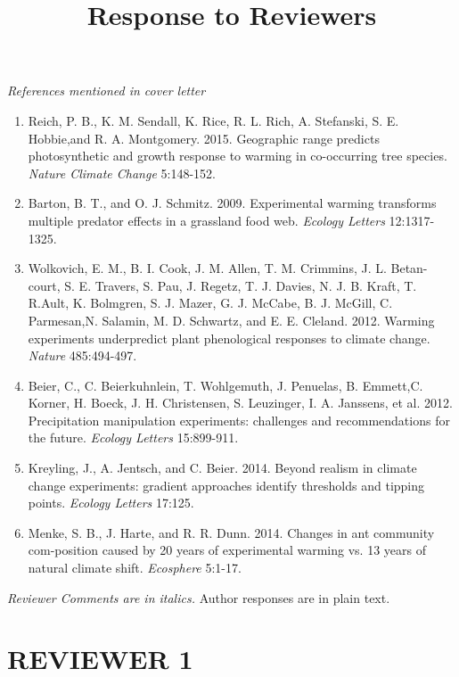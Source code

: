 \documentclass[11pt,a4paper]{letter}
\begin{document}
\begin{letter}{}
\noindent \emph{References mentioned in cover letter}
\begin{footnotesize}
\begin{enumerate}
\item Reich,  P. B.,  K. M. Sendall,  K. Rice,  R. L. Rich,  A. Stefanski,  S. E. Hobbie,and R. A. Montgomery. 2015.  Geographic range predicts photosynthetic and growth response to warming in co-occurring tree species.  \emph{Nature Climate Change} 5:148-152.
\item Barton,  B.  T.,  and  O.  J.  Schmitz.  2009.   Experimental  warming  transforms multiple predator effects in a grassland food web.   \emph{Ecology Letters} 12:1317-1325.
\item Wolkovich,  E.  M.,  B.  I.  Cook,  J.  M.  Allen,  T.  M.  Crimmins,  J.  L.  Betan-court, S. E. Travers, S. Pau, J. Regetz, T. J. Davies, N. J. B. Kraft, T. R.Ault, K. Bolmgren, S. J. Mazer, G. J. McCabe, B. J. McGill, C. Parmesan,N. Salamin, M. D. Schwartz, and E. E. Cleland. 2012.  Warming experiments underpredict plant phenological responses to climate change.  \emph{Nature} 485:494-497.
\item Beier,   C.,   C.   Beierkuhnlein,   T.   Wohlgemuth,   J.   Penuelas,   B.   Emmett,C. Korner, H. Boeck, J. H. Christensen, S. Leuzinger, I. A. Janssens, et al. 2012.  Precipitation manipulation experiments: challenges and recommendations for the future.  \emph{Ecology Letters} 15:899-911.
\item Kreyling, J., A. Jentsch, and C. Beier. 2014.  Beyond realism in climate change experiments: gradient  approaches  identify  thresholds  and  tipping  points. \emph{Ecology Letters} 17:125.
\item Menke, S. B., J. Harte, and R. R. Dunn. 2014. Changes in ant community com-position caused by 20 years of experimental warming vs. 13 years of natural climate shift.  \emph{Ecosphere} 5:1-17.

\end{enumerate}
\end{footnotesize}
\end{letter}
\clearpage
\title{Response to Reviewers}
 \emph{Reviewer Comments are in italics.} Author responses are in plain text.

\section {REVIEWER 1}
\end{document}
